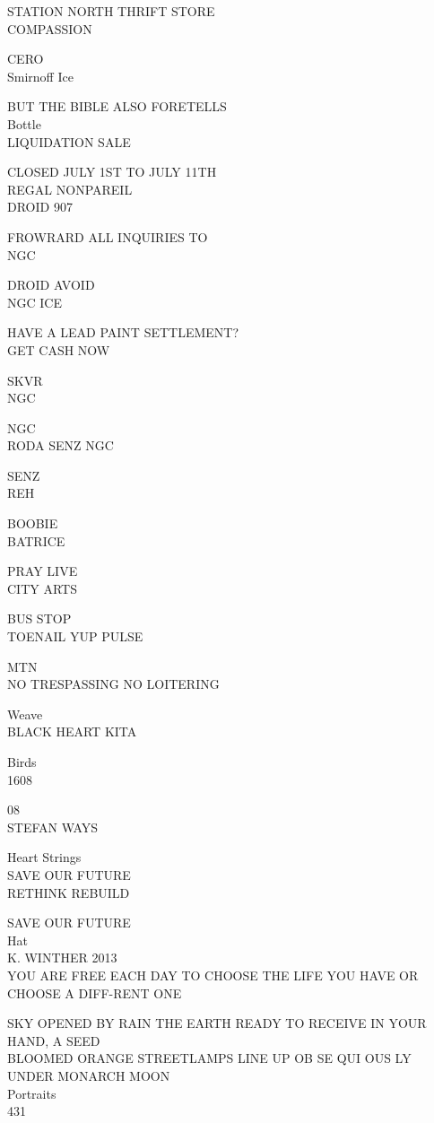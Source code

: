 \documentclass[10pt,letterpaper]{article}
\begin{document}
STATION NORTH THRIFT STORE\\
COMPASSION

CERO\\
Smirnoff Ice

BUT THE BIBLE ALSO FORETELLS\\
Bottle\\
LIQUIDATION SALE

CLOSED JULY 1ST TO JULY 11TH\\
REGAL NONPAREIL\\
DROID 907

FROWRARD ALL INQUIRIES TO\\
NGC

DROID AVOID\\
NGC ICE

HAVE A LEAD PAINT SETTLEMENT?\\
GET CASH NOW

SKVR\\
NGC

NGC\\
RODA SENZ NGC

SENZ\\
REH

BOOBIE\\
BATRICE

PRAY LIVE\\
CITY ARTS

BUS STOP\\
TOENAIL YUP PULSE

MTN\\
NO TRESPASSING NO LOITERING

Weave\\
BLACK HEART KITA

Birds\\
1608

08\\
STEFAN WAYS

Heart Strings\\
SAVE OUR FUTURE\\
RETHINK REBUILD

SAVE OUR FUTURE\\
Hat\\
K. WINTHER 2013\\
YOU ARE FREE EACH DAY TO CHOOSE THE LIFE YOU HAVE OR CHOOSE A DIFF{-}RENT ONE

SKY OPENED BY RAIN THE EARTH READY TO RECEIVE IN YOUR HAND, A SEED\\
BLOOMED ORANGE STREETLAMPS LINE UP OB SE QUI OUS LY UNDER MONARCH MOON\\
Portraits\\
431
\end{document}
